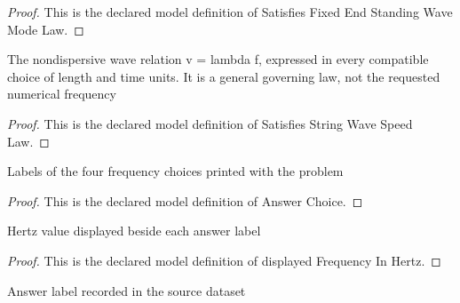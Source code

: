 \begin{proof}
  This is the declared model definition of Satisfies Fixed End Standing Wave Mode Law.
\end{proof}
\begin{definition}
  \label{def:physics:phyx-mini-0177:phyxminiproblems-problemphyxmini0177-satisfiesstringwavespeedlaw}
  The nondispersive wave relation v = lambda f, expressed in every compatible choice of length and time units. It is a general governing law, not the requested numerical frequency
\end{definition}
\begin{proof}
  This is the declared model definition of Satisfies String Wave Speed Law.
\end{proof}
\begin{definition}
  \label{def:physics:phyx-mini-0177:phyxminiproblems-problemphyxmini0177-answerchoice}
  Labels of the four frequency choices printed with the problem
\end{definition}
\begin{proof}
  This is the declared model definition of Answer Choice.
\end{proof}
\begin{definition}
  \label{def:physics:phyx-mini-0177:phyxminiproblems-problemphyxmini0177-displayedfrequencyinhertz}
  Hertz value displayed beside each answer label
\end{definition}
\begin{proof}
  This is the declared model definition of displayed Frequency In Hertz.
\end{proof}
\begin{definition}
  \label{def:physics:phyx-mini-0177:phyxminiproblems-problemphyxmini0177-recordeddatasetanswer}
  Answer label recorded in the source dataset
\end{definition}
